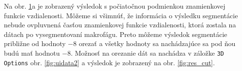 \documentclass[a4paper,11pt,oneside]{article}%
\begin{document}
\begin{figure}[H]
    \caption{}%
    \label{fig:res_subsurf}%
\end{figure}

Na obr. \ref{fig:res_subsurf}a je zobrazený výsledok s počiatočnou podmienkou znamienkovej funkcie vzdialenosti. Môžeme si všimnúť, že informácia o výsledku segmentácie nebude ovpluvnená časťou znamienkovej funkcie vzdialenosti, ktorá zostala na dátach po vysegmentovaní makrofágu. Preto môžeme výsledok segmentácie približne od hodnoty $-8$ orezať a všetky hodnoty sa nachádzajúce sa pod ňou budú mať hodnotu $-8$.  Možnosť na orezanie dát sa nachádza v záložke \texttt{3D Options} obr. \ref{fig:uidata2} a výsledok je zobrazený na obr. \ref{fig:res_cut}. 
\end{document}
